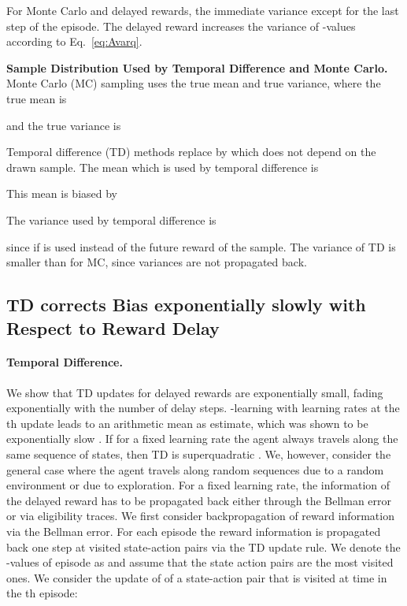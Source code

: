 \documentclass{article}
\begin{document}
\begin{appendices}
For Monte Carlo and delayed rewards,
the immediate variance  except for the
last step of the episode. 
The delayed reward
increases the variance of -values according to Eq.~\eqref{eq:Avarq}.




{\bf Sample Distribution Used by Temporal Difference and
  Monte Carlo.}
  \label{sec:ASDTDMC}
Monte Carlo (MC) sampling uses the true mean and true variance, where the true mean is

and the true variance is


Temporal difference (TD) methods replace
 by  which does not depend on
the drawn sample.
The mean which is used by temporal difference is

This mean is biased by

The variance used by temporal difference is

since  if  is used instead of
the future reward of the sample.
The variance of TD is smaller than for MC, since variances are not
propagated back.




\subsection{TD corrects Bias exponentially slowly with Respect to
  Reward Delay}
\label{sec:ATDslow}



\paragraph{Temporal Difference.}
We show that TD updates for delayed rewards are exponentially small,
fading exponentially with the number of delay steps.
-learning with learning rates  at the th update
leads to an arithmetic mean as estimate, which was shown to be
exponentially slow \cite{Beleznay:99}. 
If for a fixed learning rate the agent always travels along 
the same sequence of states, then TD is superquadratic \cite{Beleznay:99}.
We, however, consider the general case where the agent travels 
along random sequences due to a random environment or due to exploration.
For a fixed learning rate,
the information of the delayed reward has to be propagated back
either through the Bellman error or via eligibility traces.
We first consider backpropagation of reward information via the
Bellman error.
For each episode
the reward information is propagated back one step at visited
state-action pairs via the TD update rule.
We denote the -values of episode  as  and assume that the
state action pairs  are the most visited ones.
We consider the update of  of
a state-action pair  that is visited at time  in
the th episode: 
 


\end{appendices}
\end{document}
